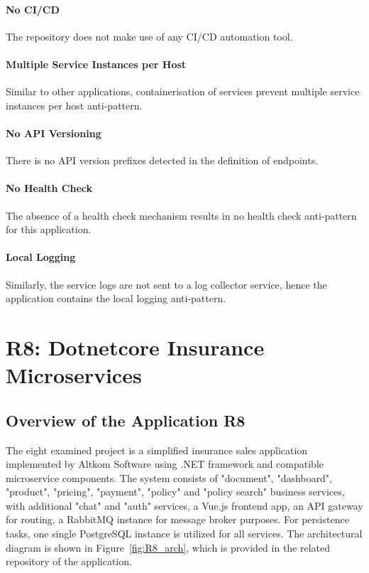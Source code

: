 \documentclass{Configuration_Files/PoliMi3i_thesis}
\begin{document}
\paragraph{No CI/CD} The repository does not make use of any CI/CD automation tool.

\paragraph{Multiple Service Instances per Host} Similar to other applications, containerisation of services prevent multiple service instances per host anti-pattern.

\paragraph{No API Versioning} There is no API version prefixes detected in the definition of endpoints.

\paragraph{No Health Check} The absence of a health check mechanism results in no health check anti-pattern for this application.

\paragraph{Local Logging} Similarly, the service logs are not sent to a log collector service, hence the application contains the local logging anti-pattern.


\section{R8: Dotnetcore Insurance Microservices}
\label{sec:R8}

\subsection{Overview of the Application R8}
\label{subsec:R8_overview}

The eight examined project is a simplified insurance sales application implemented by Altkom Software\footnotemark[102] using .NET framework and compatible microservice components.
The system consists of "document", "dashboard", "product", "pricing", "payment", "policy" and "policy search" business services, with additional "chat" and "auth" services, a Vue.js frontend app, an API gateway for routing, a RabbitMQ instance for message broker purposes.
For persistence tasks, one single PostgreSQL instance is utilized for all services.
The architectural diagram is shown in Figure~\ref{fig:R8_arch}, which is provided in the related repository of the application.
\end{document}

